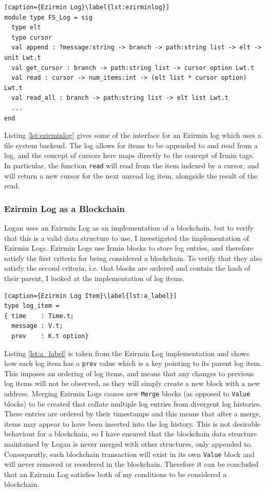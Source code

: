 \documentclass[12pt,a4paper,twoside,openright]{report}
\begin{document}
	\begin{lstlisting}[caption={Ezirmin Log}\label{lst:ezirminlog}]
module type FS_Log = sig
  type elt 
  type cursor 
  val append : ?message:string -> branch -> path:string list -> elt -> unit Lwt.t
  val get_cursor : branch -> path:string list -> cursor option Lwt.t
  val read : cursor -> num_items:int -> (elt list * cursor option) Lwt.t
  val read_all : branch -> path:string list -> elt list Lwt.t
  ...
end
	\end{lstlisting}

	Listing \ref{lst:ezirminlog} gives some of the interface for an Ezirmin log which uses a file system backend.
	The log allows for items to be appended to and read from a log, and the concept of cursors here maps directly to the concept of Irmin tags.
	In particular, the function \texttt{read} will read from the item indexed by a cursor, and will return a new cursor for the next unread log item, alongside the result of the read.

	\subsubsection*{Ezirmin Log as a Blockchain}
	Logan uses an Ezirmin Log as an implementation of a blockchain, but to verify that this is a valid data structure to use, I investigated the implementation of Ezirmin Logs.
	Ezirmin Logs use Irmin blocks to store log entries, and therefore satisfy the first criteria for being considered a blockchain. 
	To verify that they also satisfy the second criteria, i.e. that blocks are ordered and contain the hash of their parent, I looked at the implementation of log items.

	\begin{lstlisting}[caption={Ezirmin Log Item}\label{lst:a_label}]
type log_item =
{ time    : Time.t;
  message : V.t;
  prev    : K.t option}
	\end{lstlisting}

	Listing \ref{lst:a_label} is taken from the Ezirmin Log implementation and shows how each log item has a \texttt{prev} value which is a key pointing to its parent log item. 
	This imposes an ordering of log items, and means that any changes to previous log items will not be observed, as they will simply create a new block with a new address. 
	Merging Ezirmin Logs causes new \texttt{Merge} blocks (as opposed to \texttt{Value} blocks) to be created that collate multiple log entries from divergent log histories.
	These entries are ordered by their timestamps and this means that after a merge, items may appear to have been inserted into the log history.
	This is not desirable behaviour for a blockchain, so I have ensured that the blockchain data structure maintained by Logan is never merged with other structures, only appended to. 
	Consequently, each blockchain transaction will exist in its own \texttt{Value} block and will never removed or reordered in the blockchain.
	Therefore it can be concluded that an Ezirmin Log satisfies both of my conditions to be considered a blockchain.
\end{document}

